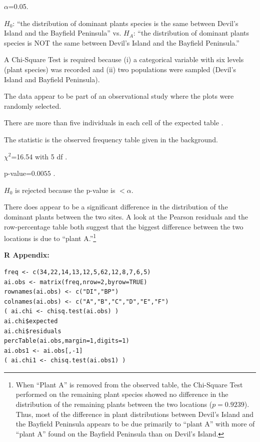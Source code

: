 \documentclass[10pt,openany]{book}\usepackage[]{graphicx}\usepackage[]{color}
\makeatletter
\newenvironment{kframe}{%
 \def\at@end@of@kframe{}%
 \ifinner\ifhmode%
  \def\at@end@of@kframe{\end{minipage}}%
  \begin{minipage}{\columnwidth}%
 \fi\fi%
 \def\FrameCommand##1{\hskip\@totalleftmargin \hskip-\fboxsep
 \colorbox{shadecolor}{##1}\hskip-\fboxsep
     \hskip-\linewidth \hskip-\@totalleftmargin \hskip\columnwidth}%
 \MakeFramed {\advance\hsize-\width
   \@totalleftmargin\z@ \linewidth\hsize
   \@setminipage}}%
 {\par\unskip\endMakeFramed%
 \at@end@of@kframe}
\newenvironment{knitrout}{}{} %
\makeatother
\begin{document}
  \begin{Enumerate}
    \item $\alpha$=0.05.
    \item $H_{0}$: ``the distribution of dominant plants species is the same between Devil's Island and the Bayfield Peninsula'' vs. $H_{A}$: ``the distribution of dominant plants species is NOT the same between Devil's Island and the Bayfield Peninsula.''
    \item A Chi-Square Test is required because (i) a categorical variable with six levels (plant species) was recorded and (ii) two populations were sampled (Devil's Island and Bayfield Peninsula).
    \item The data appear to be part of an observational study where the plots were randomly selected.
    \item There are more than five individuals in each cell of the expected table .
    \item The statistic is the observed frequency table given in the background.
    \item $\chi^{2}$=16.54 with 5 df .
    \item p-value=$0.0055$ .
    \item $H_{0}$ is rejected because the p-value is $<\alpha$.
    \item There does appear to be a significant difference in the distribution of the dominant plants between the two sites. A look at the Pearson residuals  and the row-percentage table  both suggest that the biggest difference between the two locations is due to ``plant A.''\footnote{When ``Plant A'' is removed from the observed table, the Chi-Square Test performed on the remaining plant species showed no difference in the distribution of the remaining plants between the two locations ($p=0.9239$). Thus, most of the difference in plant distributions between Devil's Island and the Bayfield Peninsula appears to be due primarily to ``plant A'' with more of ``plant A'' found on the Bayfield Peninsula than on Devil's Island.}
  \end{Enumerate}

\begin{minipage}{\textwidth}
\textbf{R Appendix:}
\begin{knitrout}
\color{fgcolor}\begin{kframe}
\begin{verbatim}
freq <- c(34,22,14,13,12,5,62,12,8,7,6,5)
ai.obs <- matrix(freq,nrow=2,byrow=TRUE)
rownames(ai.obs) <- c("DI","BP")
colnames(ai.obs) <- c("A","B","C","D","E","F")
( ai.chi <- chisq.test(ai.obs) )
ai.chi$expected
ai.chi$residuals
percTable(ai.obs,margin=1,digits=1)
ai.obs1 <- ai.obs[,-1]
( ai.chi1 <- chisq.test(ai.obs1) )
\end{verbatim}
\end{kframe}
\end{knitrout}
\end{minipage}
\end{document}
